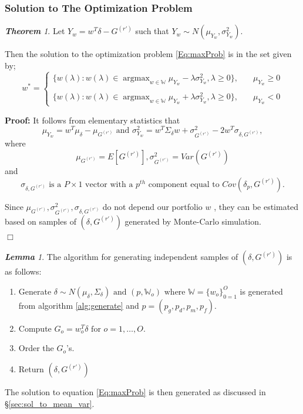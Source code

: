 \documentclass[12pt,oneside,a4paper]{book}
\theoremstyle{definition}
\theoremstyle{remark}
\newenvironment{prf}[0]{\textbf{Proof:}}{\hfill$\Box$}
\newtheorem{thm}{\bf Theorem}[subsection]
\newtheorem{lem}{\bf Lemma}[section]
\DeclareMathOperator*{\argmax}{argmax}
\begin{document}
				\subsubsection{Solution to The Optimization Problem}
					\begin{thm} \label{thm:solution_to_opt_prob}
						Let $Y_w = w^T\delta - G^{(r')}$ such that $Y_w \sim N(\mu_{Y_w}, \sigma^2_{Y_w}).$

						Then the solution to the optimization problem \ref{Eq:maxProb} is in the set given by;
						\begin{equation}
							w^* =  {\begin{cases}
								{
									\{ w(\lambda):w(\lambda) \in \argmax_{w\in \mathbb{W}} \mu_{Y_w} - \lambda \sigma^2_{Y_w}, \lambda \ge0 \}
								}, \quad & \mu_{Y_w} \ge 0  \\\\
								{
									\{ w(\lambda):w(\lambda) \in \argmax_{w\in \mathbb{W}} \mu_{Y_w} + \lambda \sigma^2_{Y_w}, \lambda \ge0 \}
								}, \quad & \mu_{Y_w} < 0
							\end{cases}}
						\end{equation}

						\begin{prf}
							It follows from elementary statistics that
							\[
							\mu_{Y_w} =  w^T\mu_{\delta} - \mu_{G^{(r')}} \text{ and } \sigma^2_{Y_w} = w^T\Sigma_{\delta}w + \sigma^2_{G^{(r')}} - 2w^T\sigma_{\delta, G^{(r')}},
							\]
							where \[
							\mu_{G^{(r')}} = E[G^{(r')}], \sigma^2_{G^{(r')}} = Var(G^{(r')})\] and \[ \sigma_{\delta, G^{(r')}} \text{ is a } P\times 1 \text{ vector with a } p^{th}\text{ component equal to } Cov(\delta_p, G^{(r')}).
							\]

							Since $\mu_{G^{(r')}}, \sigma^2_{G^{(r')}}, \sigma_{\delta, G^{(r')}}$ do not depend our portfolio $w$ , they can be estimated based on samples of $(\delta, G^{(r')})$ generated by Monte-Carlo simulation.\\

						\end{prf}
					\end{thm}

					\begin{lem}	\cite{bibid}
						The algorithm for generating independent samples of $(\delta, G^{(r')})$ is as follows:
						\begin{enumerate}
							\item Generate $\delta \sim N(\mu_\delta, \Sigma_\delta) \text{ and } (p,\mathbb{W}_o) \text{ where } \mathbb{W} = \{ w_o\}_{0=1}^O$ is generated from algorithm \ref{alg:generate} and $p = (p_g, p_d, p_m, p_f)$.
							\item Compute $G_o = w_o^T\delta \text{ for } o = 1, \dots, O.$
							\item Order the $G_o$'s.
							\item Return $(\delta, G^{(r')})$
						\end{enumerate}
					\end{lem}
					The solution to equation \eqref{Eq:maxProb} is then generated as discussed in \S \ref{sec:sol_to_mean_var}.\\
\end{document}

